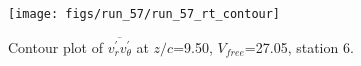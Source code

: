 \begin{figure}[H]
\centering
\texttt{[image: figs/run\_57/run\_57\_rt\_contour]}
\caption{Contour plot of $\overline{v_{r}^{\prime} v_{\theta}^{\prime}}$ at $z/c$=9.50, $V_{free}$=27.05, station 6.}
\label{fig:run_57_rt_contour}
\end{figure}


